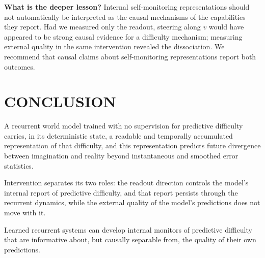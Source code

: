 \documentclass[a4paper,twoside]{article}
\begin{document}
\textbf{What is the deeper lesson?} Internal self-monitoring representations should not automatically be interpreted as the causal mechanisms of the capabilities they report. Had we measured only the readout, steering along $v$ would have appeared to be strong causal evidence for a difficulty mechanism; measuring external quality in the same intervention revealed the dissociation. We recommend that causal claims about self-monitoring representations report both outcomes.

\section{\uppercase{Conclusion}}
\label{sec:conclusion}

A recurrent world model trained with no supervision for predictive difficulty carries, in its deterministic state, a readable and temporally accumulated representation of that difficulty, and this representation predicts future divergence between imagination and reality beyond instantaneous and smoothed error statistics.

Intervention separates its two roles: the readout direction controls the model's internal report of predictive difficulty, and that report persists through the recurrent dynamics, while the external quality of the model's predictions does not move with it.

Learned recurrent systems can develop internal monitors of predictive difficulty that are informative about, but causally separable from, the quality of their own predictions.

{\small
}
\end{document}
